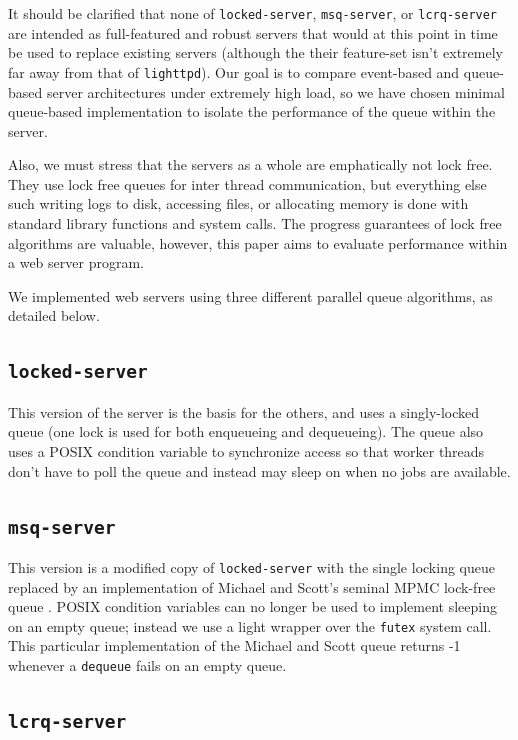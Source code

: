 \documentclass[twoside,10pt]{article}
\begin{document}
\begin{multicols}{2}
It should be clarified that none of \verb+locked-server+,
\verb+msq-server+, or \verb+lcrq-server+ are intended as full-featured
and robust servers that would at this point in time be used to replace
existing servers (although the their feature-set isn't extremely far
away from that of \verb+lighttpd+). Our goal is to compare event-based
and queue-based server architectures under extremely high load, so we
have chosen minimal queue-based implementation to isolate the
performance of the queue within the server.

Also, we must stress that the servers as a whole are emphatically not 
lock free. They use lock free queues for inter thread communication, but 
everything else such writing logs to disk, accessing files, or allocating 
memory is done with standard library functions and system calls. The progress
guarantees of lock free algorithms are valuable, however, this paper aims to 
evaluate performance within a web server program. 

We implemented web servers using three different parallel queue algorithms, as detailed below. 

\subsection{\texttt{locked-server}}

This version of the server is the basis for the others, and uses a
singly-locked queue (one lock is used for both enqueueing and
dequeueing). The queue also uses a POSIX condition variable to synchronize
access so that worker threads don't have to poll the queue and instead may
sleep on when no jobs are available.

\subsection{\texttt{msq-server}}

This version is a modified copy of \verb+locked-server+ with the single
locking queue replaced by an implementation of Michael and Scott's
seminal MPMC lock-free queue \cite{synch-1.0.1}. POSIX
condition variables can no longer be used to implement sleeping on an
empty queue; instead we use a light wrapper over the \verb+futex+ system
call. This particular implementation of the Michael and Scott queue
returns -1 whenever a \verb+dequeue+ fails on an empty queue. 

\subsection{\texttt{lcrq-server}}


\end{multicols}
\end{document}
